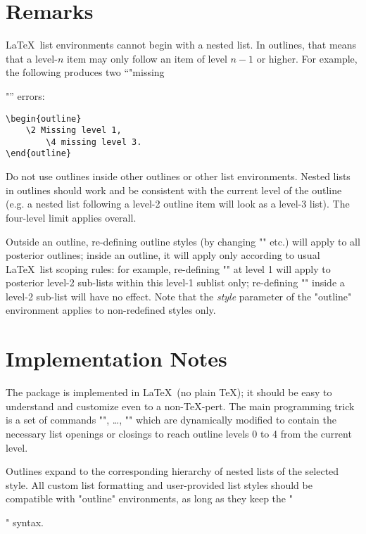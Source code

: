 \documentclass[11pt]{article}
\begin{document}
\section{Remarks}

\LaTeX\ list environments cannot begin with a nested list.
In outlines, that means that a level-$n$ item may only follow an item
of level $n-1$ or higher.  For example, the following produces two
``"missing \item"'' errors:

\begin{verbatim}
\begin{outline}
    \2 Missing level 1,
        \4 missing level 3.
\end{outline}
\end{verbatim}

Do not use outlines inside other outlines or other list environments.
Nested lists in outlines should work and be consistent with the current
level of the outline (e.g. a nested list following a level-2 outline
item will look as a level-3 list). The four-level limit applies overall.

Outside an outline, re-defining outline styles (by changing "\outlinei" etc.) will apply to all posterior outlines; inside an outline, it will apply only according to usual \LaTeX\ list scoping rules: for example, re-defining "\outlineii" at level 1 will apply to posterior level-2 sub-lists within this level-1 sublist only; re-defining "\outlineii" inside a level-2 sub-list will have no effect.  Note that the \emph{style} parameter of the "outline" environment applies to non-redefined styles only.

\section{Implementation Notes}

The package is implemented in \LaTeX\ (no plain \TeX); it should be
easy to understand and customize even to a non-\TeX-pert.  The main
programming trick is a set of commands "\ol@toz", \dots, "\ol@toiiii"
which are dynamically modified to contain the necessary list openings or closings to reach outline levels 0 to 4 from the current level.

Outlines expand to the corresponding hierarchy of nested lists of the
selected style.  All custom list formatting and user-provided list styles
should be compatible with "outline" environments, as long as they keep
the "\item" syntax.
\end{document}

